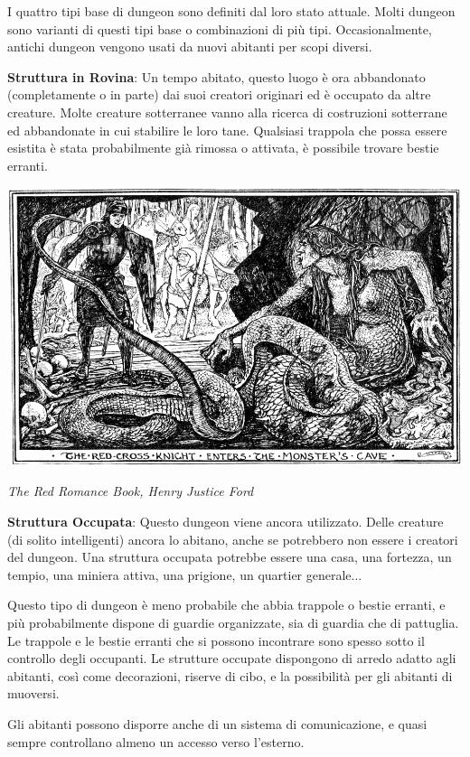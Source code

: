 \begin{multicols}{2}
I quattro tipi base di dungeon sono definiti dal loro stato attuale. Molti dungeon sono varianti di questi tipi base o combinazioni di più tipi. Occasionalmente, antichi dungeon vengono usati da nuovi abitanti per scopi diversi.

\textbf{Struttura in Rovina}: Un tempo abitato, questo luogo è ora abbandonato (completamente o in parte) dai suoi creatori originari ed è occupato da altre creature. Molte creature sotterranee vanno alla ricerca di costruzioni sotterrane ed abbandonate in cui stabilire le loro tane. Qualsiasi trappola che possa essere esistita è stata probabilmente già rimossa o attivata, è possibile trovare bestie erranti.

\medskip
\begin{center}
\includegraphics[width=0.9\linewidth]{immagini/avventure_dungeon.png}

\emph{The Red Romance Book, Henry Justice Ford}
\end{center}
\medskip

\textbf{Struttura Occupata}: Questo dungeon viene ancora utilizzato. Delle creature (di solito intelligenti) ancora lo abitano, anche se potrebbero non essere i creatori del dungeon. Una struttura occupata potrebbe essere una casa, una fortezza, un tempio, una miniera attiva, una prigione, un quartier generale...

Questo tipo di dungeon è meno probabile che abbia trappole o bestie erranti, e più probabilmente dispone di guardie organizzate, sia di guardia che di pattuglia. Le trappole e le bestie erranti che si possono incontrare sono spesso sotto il controllo degli occupanti. Le strutture occupate dispongono di arredo adatto agli abitanti, così come decorazioni, riserve di cibo, e la possibilità per gli abitanti di muoversi.

Gli abitanti possono disporre anche di un sistema di comunicazione, e quasi sempre controllano almeno un accesso verso l'esterno.


\end{multicols}

